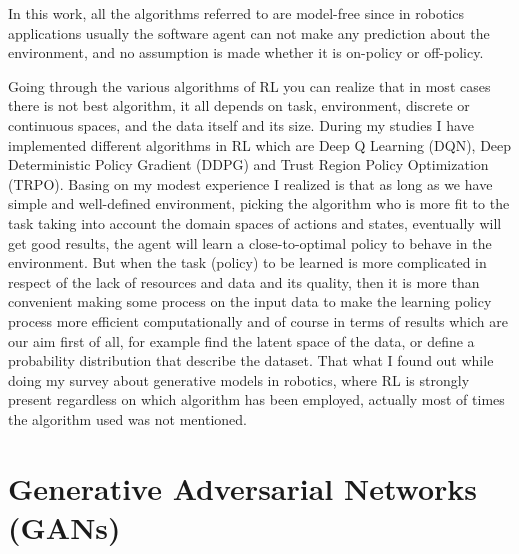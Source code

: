 In this work, all the algorithms referred to are model-free since in robotics applications usually the software agent can not make any prediction about the environment, and no assumption is made whether it is on-policy or off-policy.

\vspace{0.3cm}
Going through the various algorithms of RL you can realize that in most cases there is not best algorithm, it all depends on task, environment, discrete or continuous spaces, and the data itself and its size. During my studies I have implemented different algorithms in RL which are Deep Q Learning (DQN), Deep Deterministic Policy Gradient (DDPG) and Trust Region Policy Optimization (TRPO). Basing on my modest experience I realized is that as long as we have simple and well-defined environment, picking the algorithm who is more fit to the task taking into account the domain spaces of actions and states, eventually will get good results, the agent will learn a close-to-optimal policy to behave in the environment. But when the task (policy) to be learned is more complicated in respect of the lack of resources and data and its quality, then it is more than convenient making some process on the input data to make the learning policy process more efficient computationally and of course in terms of results which are our aim first of all, for example find the latent space of the data, or define a probability distribution that describe the dataset. That what I found out while doing my survey about generative models in robotics, where RL is strongly present regardless on which algorithm has been employed, actually most of times the algorithm used was not mentioned. 

\section{Generative Adversarial Networks (GANs)}

